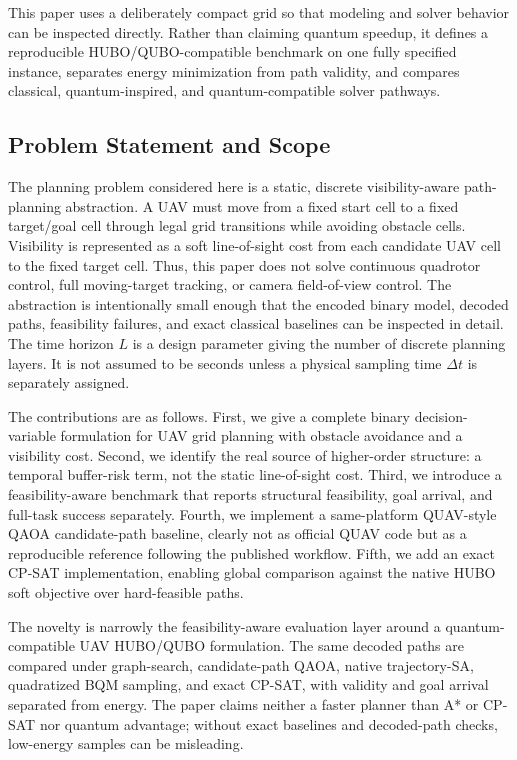 \documentclass[letterpaper]{article} %
\begin{document}
This paper uses a deliberately compact grid so that modeling and solver behavior can be inspected directly. Rather than claiming quantum speedup, it defines a reproducible HUBO/QUBO-compatible benchmark on one fully specified instance, separates energy minimization from path validity, and compares classical, quantum-inspired, and quantum-compatible solver pathways.

\subsection{Problem Statement and Scope}
The planning problem considered here is a static, discrete visibility-aware path-planning abstraction. A UAV must move from a fixed start cell to a fixed target/goal cell through legal grid transitions while avoiding obstacle cells. Visibility is represented as a soft line-of-sight cost from each candidate UAV cell to the fixed target cell. Thus, this paper does not solve continuous quadrotor control, full moving-target tracking, or camera field-of-view control. The abstraction is intentionally small enough that the encoded binary model, decoded paths, feasibility failures, and exact classical baselines can be inspected in detail. The time horizon $L$ is a design parameter giving the number of discrete planning layers. It is not assumed to be seconds unless a physical sampling time $\Delta t$ is separately assigned.

The contributions are as follows. First, we give a complete binary decision-variable formulation for UAV grid planning with obstacle avoidance and a visibility cost. Second, we identify the real source of higher-order structure: a temporal buffer-risk term, not the static line-of-sight cost. Third, we introduce a feasibility-aware benchmark that reports structural feasibility, goal arrival, and full-task success separately. Fourth, we implement a same-platform QUAV-style QAOA candidate-path baseline, clearly not as official QUAV code but as a reproducible reference following the published workflow. Fifth, we add an exact CP-SAT implementation, enabling global comparison against the native HUBO soft objective over hard-feasible paths.

The novelty is narrowly the feasibility-aware evaluation layer around a quantum-compatible UAV HUBO/QUBO formulation. The same decoded paths are compared under graph-search, candidate-path QAOA, native trajectory-SA, quadratized BQM sampling, and exact CP-SAT, with validity and goal arrival separated from energy. The paper claims neither a faster planner than A* or CP-SAT nor quantum advantage; without exact baselines and decoded-path checks, low-energy samples can be misleading.
\end{document}

